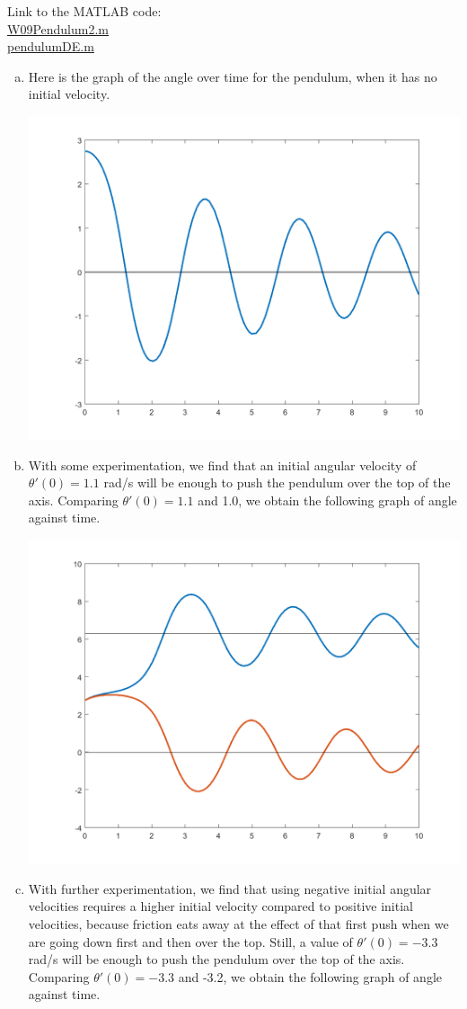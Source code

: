 \begin{enumerate}[1.]
\begin{Question}
\end{Question}

\begin{Solution}
Link to the MATLAB code: \\
\href{http://www.mast.queensu.ca/~apsc171/MNTCP01/PracticeProblems/MATLAB/W09Pendulum1.m}{W09Pendulum2.m} \\
\href{http://www.mast.queensu.ca/~apsc171/MNTCP01/PracticeProblems/MATLAB/pendulumDE.m}{pendulumDE.m} \\

\begin{enumerate}[(a)]
\item Here is the graph of the angle over time for the pendulum, when it has no initial velocity.

\includegraphics[width=0.33\linewidth]{graphics/Week09_Pendulum/pendulum_overtop_1} 

\item With some experimentation, we find that an initial angular
  velocity of $\theta'(0) = 1.1$ rad/s will be enough to push the
  pendulum over the top of the axis. Comparing $\theta'(0) = 1.1$ and
  1.0, we obtain the following graph of angle against time.

\includegraphics[width=0.5\linewidth]{graphics/Week09_Pendulum/pendulum_overtop_2} 

\item With further experimentation, we find that using negative
  initial angular velocities requires a higher initial velocity
  compared to positive initial velocities, because friction eats away
  at the effect of that first push when we are going down first and
  then over the top.  Still, a value of $\theta'(0) = -3.3$ rad/s will
  be enough to push the pendulum over the top of the axis. Comparing
  $\theta'(0) = -3.3$ and -3.2, we obtain the following graph of angle
  against time.


\end{enumerate}
\end{Solution}
\end{enumerate}

